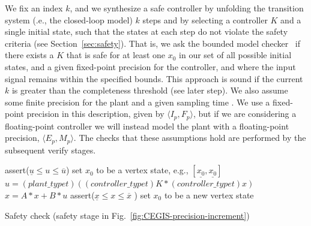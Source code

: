 We fix an index $k$, 
and we synthesize a safe controller by
unfolding the transition system (.e., the closed-loop model) $k$ steps and by selecting a controller $K$ and a single initial state, 
such that the states at each step do not violate the safety criteria (see Section~\ref{sec:safety}).    
That is, we ask the bounded model checker~\cite{ClarkeKL04} if there exists a $K$ that is safe for at least one $x_0$ in our set of all possible initial states, and a given fixed-point precision for the controller, and where the input signal remains within the specified bounds. 
This approach is sound  if the current $k$ is greater than the completeness threshold (see later step).  
We also assume some finite precision for the plant and a given sampling time .  
We use a fixed-point precision in this description, given by $\langle I_p,F_p\rangle$, but if we are considering a floating-point controller we will instead model the plant with a floating-point precision, $\langle E_p,M_p\rangle$.
The checks that these assumptions hold are performed by the subsequent {\sc verify} stages. 




\begin{algorithm}[]
\begin{algorithmic}[1]
\State assert($ \underline{u}  \leq u \leq \overline{u}$)
 \State set $x_0$ to be a vertex state, e.g., $[\underline{x_0},\underline{x_0}]$	
		\State $u = (plant\_typet)((controller\_typet)K * (controller\_typet) x)$
		\State $x = A * x + B * u$
		\State assert($\underline{x} \leq x \leq \overline{x}$ )
  	\EndFor
  	\State set $x_0$ to be a new vertex state
  	\EndFor
\EndFunction
\end{algorithmic}
\caption{Safety check ({\sc safety} stage in Fig.~\ref{fig:CEGIS-precision-increment})\label{alg:safetycheck}}
\end{algorithm}

